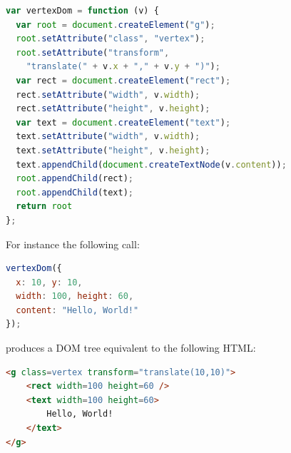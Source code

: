 \documentclass[american,english,runningheads]{llncs}
\begin{document}
\begin{lstlisting}[language=JavaScript,label=dom-api,caption=DOM fragment creation using the native API]
var vertexDom = function (v) {
  var root = document.createElement("g");
  root.setAttribute("class", "vertex");
  root.setAttribute("transform",
    "translate(" + v.x + "," + v.y + ")");
  var rect = document.createElement("rect");
  rect.setAttribute("width", v.width);
  rect.setAttribute("height", v.height);
  var text = document.createElement("text");
  text.setAttribute("width", v.width);
  text.setAttribute("height", v.height);
  text.appendChild(document.createTextNode(v.content));
  root.appendChild(rect);
  root.appendChild(text);
  return root
};
\end{lstlisting}
% 
% 
% 
% 
% 


For instance the following call:
\begin{lstlisting}[language=JavaScript]
vertexDom({
  x: 10, y: 10,
  width: 100, height: 60,
  content: "Hello, World!"
});
\end{lstlisting}
produces a DOM tree equivalent to the following HTML:
\begin{lstlisting}[language=HTML]
<g class=vertex transform="translate(10,10)">
    <rect width=100 height=60 />
    <text width=100 height=60>
        Hello, World!
    </text>
</g>
\end{lstlisting}
\end{document}

